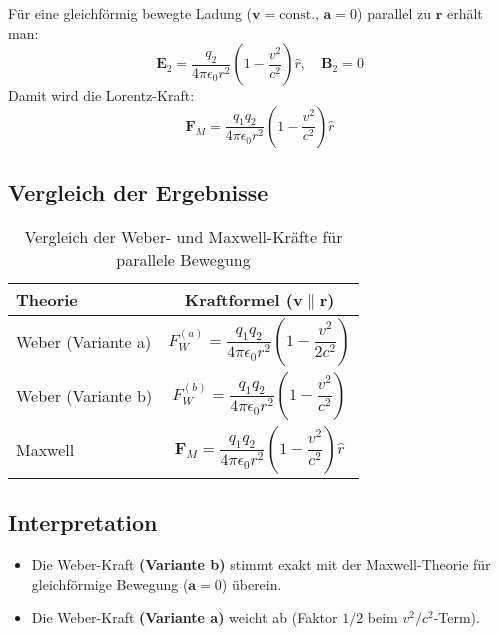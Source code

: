 Für eine gleichförmig bewegte Ladung ($\mathbf{v} = \text{const.}$, $\mathbf{a} = 0$) parallel zu $\mathbf{r}$ erhält man:
\begin{equation}
\mathbf{E}_2 = \frac{q_2}{4 \pi \epsilon_0 r^2} \left(1 - \frac{v^2}{c^2}\right) \hat{r}, \quad \mathbf{B}_2 = 0
\end{equation}
Damit wird die Lorentz-Kraft:
\begin{equation}
\mathbf{F}_M = \frac{q_1 q_2}{4 \pi \epsilon_0 r^2} \left(1 - \frac{v^2}{c^2}\right) \hat{r}
\end{equation}

\subsection{Vergleich der Ergebnisse}
\begin{table}[h]
\centering
\begin{tabular}{lc}
\hline
\textbf{Theorie} & \textbf{Kraftformel ($\mathbf{v} \parallel \mathbf{r}$)} \\
\hline
Weber (Variante a) & $F_W^{(a)} = \dfrac{q_1 q_2}{4 \pi \epsilon_0 r^2} \left(1 - \dfrac{v^2}{2 c^2}\right)$ \\
Weber (Variante b) & $F_W^{(b)} = \dfrac{q_1 q_2}{4 \pi \epsilon_0 r^2} \left(1 - \dfrac{v^2}{c^2}\right)$ \\
Maxwell & $\mathbf{F}_M = \dfrac{q_1 q_2}{4 \pi \epsilon_0 r^2} \left(1 - \dfrac{v^2}{c^2}\right) \hat{r}$ \\
\hline
\end{tabular}
\caption{Vergleich der Weber- und Maxwell-Kräfte für parallele Bewegung}
\end{table}

\subsection{Interpretation}
\begin{itemize}
\item Die Weber-Kraft \textbf{(Variante b)} stimmt exakt mit der Maxwell-Theorie für gleichförmige Bewegung ($\mathbf{a} = 0$) überein.
\item Die Weber-Kraft \textbf{(Variante a)} weicht ab (Faktor $1/2$ beim $v^2/c^2$-Term).
\end{itemize}
